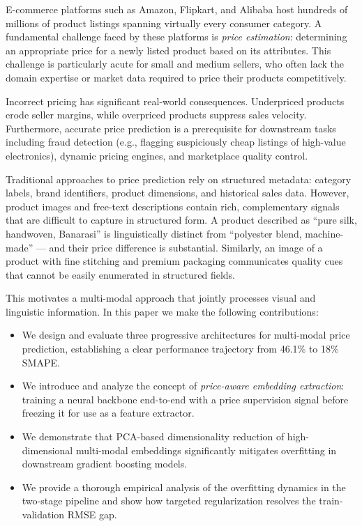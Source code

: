 \documentclass[conference]{IEEEtran}
\begin{document}
E-commerce platforms such as Amazon, Flipkart, and Alibaba host hundreds of millions of product listings spanning virtually every consumer category. A fundamental challenge faced by these platforms is \textit{price estimation}: determining an appropriate price for a newly listed product based on its attributes. This challenge is particularly acute for small and medium sellers, who often lack the domain expertise or market data required to price their products competitively.

Incorrect pricing has significant real-world consequences. Underpriced products erode seller margins, while overpriced products suppress sales velocity. Furthermore, accurate price prediction is a prerequisite for downstream tasks including fraud detection (e.g., flagging suspiciously cheap listings of high-value electronics), dynamic pricing engines, and marketplace quality control.

Traditional approaches to price prediction rely on structured metadata: category labels, brand identifiers, product dimensions, and historical sales data. However, product images and free-text descriptions contain rich, complementary signals that are difficult to capture in structured form. A product described as ``pure silk, handwoven, Banarasi'' is linguistically distinct from ``polyester blend, machine-made'' — and their price difference is substantial. Similarly, an image of a product with fine stitching and premium packaging communicates quality cues that cannot be easily enumerated in structured fields.

This motivates a multi-modal approach that jointly processes visual and linguistic information. In this paper we make the following contributions:

\begin{itemize}
    \item We design and evaluate three progressive architectures for multi-modal price prediction, establishing a clear performance trajectory from 46.1\% to 18\% SMAPE.
    \item We introduce and analyze the concept of \textit{price-aware embedding extraction}: training a neural backbone end-to-end with a price supervision signal before freezing it for use as a feature extractor.
    \item We demonstrate that PCA-based dimensionality reduction of high-dimensional multi-modal embeddings significantly mitigates overfitting in downstream gradient boosting models.
    \item We provide a thorough empirical analysis of the overfitting dynamics in the two-stage pipeline and show how targeted regularization resolves the train-validation RMSE gap.
\end{itemize}
\end{document}
